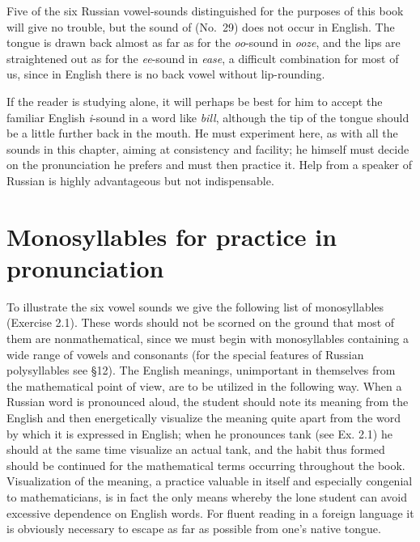 Five of the six Russian vowel-sounds distinguished for the purposes of this book will give no trouble, but the sound of  (No.~29) does not occur in English. The tongue is drawn back almost as far as for the 
\emph{oo}-sound in \emph{ooze}, and the lips are straightened out as for the \emph{ee}-sound in \emph{ease}, a difficult combination for most of us, since in English there is no back vowel without lip-rounding.

If the reader is studying alone, it will perhaps be best for him to accept the familiar English \emph{i}-sound in a word like \emph{bill}, although the tip of the tongue should be a little further back in the mouth. He must experiment here, as with all the sounds in this chapter, aiming at consistency and facility; he himself must decide on the pronunciation he prefers and must then practice it. Help from a speaker of Russian is highly advantageous but not indispensable.

\section{Monosyllables for practice in pronunciation}

To illustrate the six vowel sounds we give the following list of monosyllables (Exercise 2.1). These words should not be scorned on the ground that most of them are nonmathematical, since we must begin with monosyllables containing a wide range of vowels and consonants (for the special features of Russian polysyllables see §12). The English meanings, unimportant in themselves from the mathematical point of view, are to be utilized in the following way. When a Russian word is pronounced aloud, the student should note its meaning from the English and then energetically visualize the meaning quite apart from the word by which it is expressed in English; when he pronounces  tank (see Ex. 2.1) he should at the same time visualize an actual tank, and the habit thus formed should be continued for the mathematical terms occurring throughout the book. Visualization of the meaning, a practice valuable in itself and especially congenial to mathematicians, is in fact the only means whereby the lone student can avoid excessive dependence on English words. For fluent reading in a foreign language it is obviously necessary to escape as far as possible from one's native tongue.

